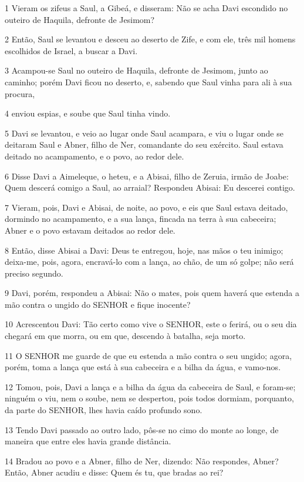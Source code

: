 \par 1 Vieram os zifeus a Saul, a Gibeá, e disseram: Não se acha Davi escondido no outeiro de Haquila, defronte de Jesimom?
\par 2 Então, Saul se levantou e desceu ao deserto de Zife, e com ele, três mil homens escolhidos de Israel, a buscar a Davi.
\par 3 Acampou-se Saul no outeiro de Haquila, defronte de Jesimom, junto ao caminho; porém Davi ficou no deserto, e, sabendo que Saul vinha para ali à sua procura,
\par 4 enviou espias, e soube que Saul tinha vindo.
\par 5 Davi se levantou, e veio ao lugar onde Saul acampara, e viu o lugar onde se deitaram Saul e Abner, filho de Ner, comandante do seu exército. Saul estava deitado no acampamento, e o povo, ao redor dele.
\par 6 Disse Davi a Aimeleque, o heteu, e a Abisai, filho de Zeruia, irmão de Joabe: Quem descerá comigo a Saul, ao arraial? Respondeu Abisai: Eu descerei contigo.
\par 7 Vieram, pois, Davi e Abisai, de noite, ao povo, e eis que Saul estava deitado, dormindo no acampamento, e a sua lança, fincada na terra à sua cabeceira; Abner e o povo estavam deitados ao redor dele.
\par 8 Então, disse Abisai a Davi: Deus te entregou, hoje, nas mãos o teu inimigo; deixa-me, pois, agora, encravá-lo com a lança, ao chão, de um só golpe; não será preciso segundo.
\par 9 Davi, porém, respondeu a Abisai: Não o mates, pois quem haverá que estenda a mão contra o ungido do SENHOR e fique inocente?
\par 10 Acrescentou Davi: Tão certo como vive o SENHOR, este o ferirá, ou o seu dia chegará em que morra, ou em que, descendo à batalha, seja morto.
\par 11 O SENHOR me guarde de que eu estenda a mão contra o seu ungido; agora, porém, toma a lança que está à sua cabeceira e a bilha da água, e vamo-nos.
\par 12 Tomou, pois, Davi a lança e a bilha da água da cabeceira de Saul, e foram-se; ninguém o viu, nem o soube, nem se despertou, pois todos dormiam, porquanto, da parte do SENHOR, lhes havia caído profundo sono.
\par 13 Tendo Davi passado ao outro lado, pôs-se no cimo do monte ao longe, de maneira que entre eles havia grande distância.
\par 14 Bradou ao povo e a Abner, filho de Ner, dizendo: Não respondes, Abner? Então, Abner acudiu e disse: Quem és tu, que bradas ao rei?
